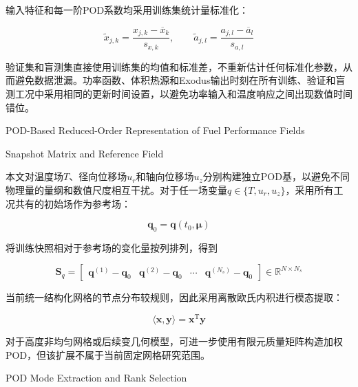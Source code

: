 输入特征和每一阶POD系数均采用训练集统计量标准化：

\begin{equation}
	\widetilde{x}_{j,k}
	=
	\frac{x_{j,k}-\overline{x}_k}{s_{x,k}},
	\qquad
	\widetilde{a}_{j,l}
	=
	\frac{a_{j,l}-\overline{a}_l}{s_{a,l}}
	\label{eq:formal_standardization}
\end{equation}

验证集和盲测集直接使用训练集的均值和标准差，不重新估计任何标准化参数，从而避免数据泄漏。功率函数、体积热源和Exodus输出时刻在所有训练、验证和盲测工况中采用相同的更新时间设置，以避免功率输入和温度响应之间出现数值时间错位。

{POD-Based Reduced-Order Representation of Fuel Performance Fields}

{Snapshot Matrix and Reference Field}

本文对温度场$T$、径向位移场$u_r$和轴向位移场$u_z$分别构建独立POD基，以避免不同物理量的量纲和数值尺度相互干扰。对于任一场变量$q\in\{T,u_r,u_z\}$，采用所有工况共有的初始场作为参考场：

\begin{equation}
	\boldsymbol{q}_0
	=
	\boldsymbol{q}(t_0,\boldsymbol{\mu})
	\label{eq:pod_reference_field_complete}
\end{equation}

将训练快照相对于参考场的变化量按列排列，得到

\begin{equation}
	\boldsymbol{S}_q
	=
	\begin{bmatrix}
		\boldsymbol{q}^{(1)}-\boldsymbol{q}_0 &
		\boldsymbol{q}^{(2)}-\boldsymbol{q}_0 &
		\cdots &
		\boldsymbol{q}^{(N_s)}-\boldsymbol{q}_0
	\end{bmatrix}
	\in\mathbb{R}^{N\times N_s}
	\label{eq:pod_snapshot_matrix_complete}
\end{equation}

当前统一结构化网格的节点分布较规则，因此采用离散欧氏内积进行模态提取：

\begin{equation}
	\langle\boldsymbol{x},\boldsymbol{y}\rangle
	=\boldsymbol{x}^{\mathrm T}\boldsymbol{y}
	\label{eq:pod_inner_product_complete}
\end{equation}

对于高度非均匀网格或后续变几何模型，可进一步使用有限元质量矩阵构造加权POD，但该扩展不属于当前固定网格研究范围。

{POD Mode Extraction and Rank Selection}

